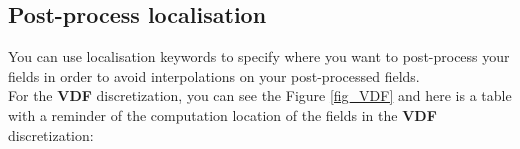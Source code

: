 \subsection{Post-process localisation}
You can use localisation keywords to specify where you want to post-process your fields in order to avoid interpolations on your post-processed fields.\\


For the \textbf{VDF} discretization, you can see the Figure \ref{fig_VDF} and here is a table with a reminder of the computation location of the fields in the \textbf{VDF} discretization:

